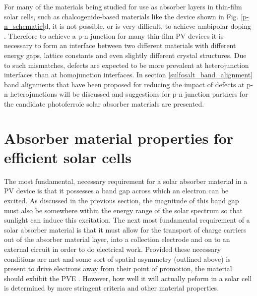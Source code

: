 \documentclass[11pt, twoside]{report}
\begin{document}
For many of the materials being studied for use as absorber layers in thin-film solar cells, such as chalcogenide-based materials like the device shown in Fig. \ref{p-n_schematic}d, it is not possible, or is very difficult, to achieve ambipolar doping \cite{band_alignment_review, Zhang_doping_limits}. Therefore to achieve a p-n junction for many thin-film PV devices it is necessary to form an interface between two different materials with different energy gaps, lattice constants and even slightly different crystal structures. Due to such mismatches, defects are expected to be more prevalent at heterojunction interfaces than at homojunction interfaces. In section \ref{sulfosalt_band_alignment} band alignments that have been proposed for reducing the impact of defects at p-n heterojunctions will be discussed and suggestions for p-n junction partners for the candidate photoferroic solar absorber materials are presented.


\section{Absorber material properties for efficient solar cells}\label{PV_properties}
The most fundamental, necessary requirement for a solar absorber material in a PV device is that it possesses a band gap across which an electron can be excited. As discussed in the previous section, the magnitude of this band gap must also be somewhere within the energy range of the solar spectrum so that sunlight can induce this excitation. The next most fundamental requirement of a solar absorber material is that it must allow for the transport of charge carriers out of the absorber material layer, into a collection electrode and on to an external circuit in order to do electrical work. Provided these necessary conditions are met and some sort of spatial asymmetry (outlined above) is present to drive electrons away from their point of promotion, the material should exhibit the PVE \cite{Nelson2}. However, how well it will actually peform in a solar cell is determined by more stringent criteria and other material properties. 
\end{document}
